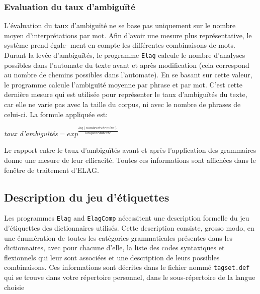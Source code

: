 \subsubsection{Evaluation du taux d’ambiguïté}
L’évaluation du taux d’ambiguïté ne se base pas uniquement sur le nombre moyen d’interprétations
par mot. Afin d’avoir une mesure plus représentative, le système prend égale-
ment en compte les différentes combinaisons de mots. Durant la levée d’ambiguïtés, le programme 
 \verb+Elag+ calcule le nombre d’analyses possibles dans l’automate du texte avant et après
 modification (cela correspond au nombre de chemins possibles dans l’automate). En se basant sur
 cette valeur, le programme calcule l’ambiguïté moyenne par phrase et par mot. C’est cette dernière
 mesure qui est utilisée pour représenter le taux d’ambiguïtés du texte, car elle ne varie pas avec
 la taille du corpus, ni avec le nombre de phrases de celui-ci. La formule appliquée est:



\bigskip
\begin{center}
	\textit{taux d’ambiguïtés}$=exp^{\frac{log(nombre de chemins)}{longueur du texte}}$
\end{center}

\bigskip \noindent Le rapport entre le taux d’ambiguïtés avant et après l’application des grammaires
donne une mesure de leur efficacité. Toutes ces informations sont affichées dans le fenêtre de
traitement d’ELAG.



\subsection{Description du jeu d’étiquettes}
\label{section-elag-tagset}

Les programmes \verb+Elag+ and \verb+ElagComp+  
 nécessitent une description formelle du jeu d’étiquettes
des dictionnaires utilisés. Cette description consiste, grosso modo, en une énumération de toutes
les catégories grammaticales présentes dans les dictionnaires, avec pour
chacune d’elle, la liste des codes syntaxiques et flexionnels qui leur sont associées et une
description de leurs possibles combinaisons. Ces informations sont décrites dans le fichier
nommé \verb$tagset.def$ qui se trouve dans votre répertoire personnel, dans le sous-répertoire de la langue choisie


